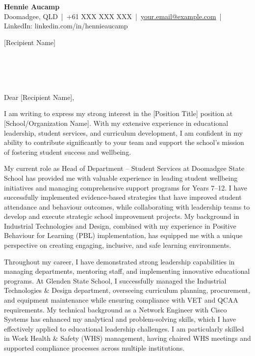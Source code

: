 \documentclass[11pt,a4paper]{article}
\newcommand{\contact}[5]{
    \begin{center}
        {\Huge \textbf{#1}} \\[8pt]
        #2 \,|\, #3 \,|\, \href{mailto:#4}{#4} \,|\, #5
    \end{center}
    \vspace{0.5cm}
}
\newcommand{\todaydate}{\DTMnow}
\begin{document}
\contact{Hennie Aucamp}
{Doomadgee, QLD}
{+61 XXX XXX XXX}
{your.email@example.com}
{LinkedIn: linkedin.com/in/hennieaucamp}

\begin{flushright}
\todaydate
\end{flushright}

\vspace{1cm}

[Recipient Name] \\
[Position Title] \\
[School/Organization Name] \\
[Address Line 1] \\
[Address Line 2] \\
[City, State, Postcode]

\vspace{1cm}

Dear [Recipient Name],

I am writing to express my strong interest in the [Position Title] position at [School/Organization Name]. With my extensive experience in educational leadership, student services, and curriculum development, I am confident in my ability to contribute significantly to your team and support the school's mission of fostering student success and wellbeing.

My current role as Head of Department – Student Services at Doomadgee State School has provided me with valuable experience in leading student wellbeing initiatives and managing comprehensive support programs for Years 7–12. I have successfully implemented evidence-based strategies that have improved student attendance and behaviour outcomes, while collaborating with leadership teams to develop and execute strategic school improvement projects. My background in Industrial Technologies and Design, combined with my experience in Positive Behaviour for Learning (PBL) implementation, has equipped me with a unique perspective on creating engaging, inclusive, and safe learning environments.

Throughout my career, I have demonstrated strong leadership capabilities in managing departments, mentoring staff, and implementing innovative educational programs. At Glenden State School, I successfully managed the Industrial Technologies \& Design department, overseeing curriculum planning, procurement, and equipment maintenance while ensuring compliance with VET and QCAA requirements. My technical background as a Network Engineer with Cisco Systems has enhanced my analytical and problem-solving skills, which I have effectively applied to educational leadership challenges. I am particularly skilled in Work Health \& Safety (WHS) management, having chaired WHS meetings and supported compliance processes across multiple institutions.
\end{document}
